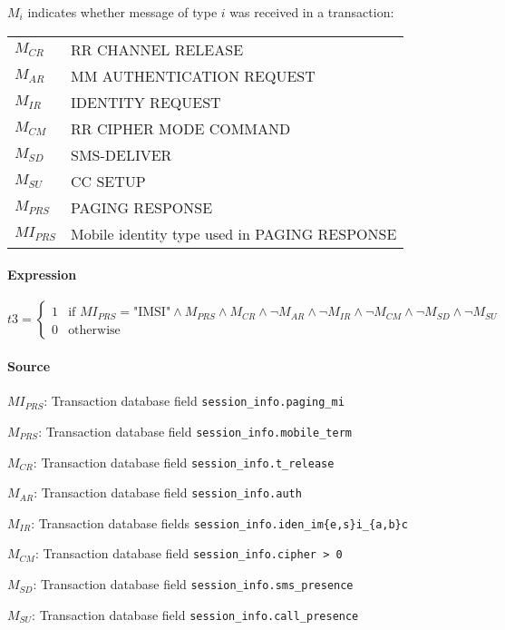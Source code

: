 \documentclass[a4paper,11pt,notitlepage,bigheadings,oneside]{scrartcl}
\begin{document}
$M_i$ indicates whether message of type $i$ was received in a transaction:

\begin{tabular}{ll}
\hline
$M_{CR}$   & RR CHANNEL RELEASE \\
$M_{AR}$   & MM AUTHENTICATION REQUEST \\
$M_{IR}$   & IDENTITY REQUEST \\
$M_{CM}$   & RR CIPHER MODE COMMAND \\
$M_{SD}$   & SMS-DELIVER \\
$M_{SU}$   & CC SETUP \\
$M_{PRS}$  & PAGING RESPONSE \\
$MI_{PRS}$ & Mobile identity type used in PAGING RESPONSE \\
\hline
\end{tabular}

\paragraph{Expression}

$t3 =
\begin{cases}
	1 & \text{if } MI_{PRS} = \text{"IMSI"} \wedge M_{PRS} \wedge M_{CR} \wedge \neg M_{AR} \wedge \neg M_{IR} \wedge \neg M_{CM} \wedge \neg M_{SD} \wedge \neg M_{SU} \\
	0 & \text{otherwise}
\end{cases}$

\paragraph{Source}

$MI_{PRS}$: Transaction database field \verb|session_info.paging_mi|

$M_{PRS}$: Transaction database field \verb|session_info.mobile_term|

$M_{CR}$: Transaction database field \verb|session_info.t_release|

$M_{AR}$: Transaction database field \verb|session_info.auth|

$M_{IR}$: Transaction database fields \verb|session_info.iden_im{e,s}i_{a,b}c|

$M_{CM}$: Transaction database field \verb|session_info.cipher > 0|

$M_{SD}$: Transaction database field \verb|session_info.sms_presence|

$M_{SU}$: Transaction database field \verb|session_info.call_presence|
\end{document}
